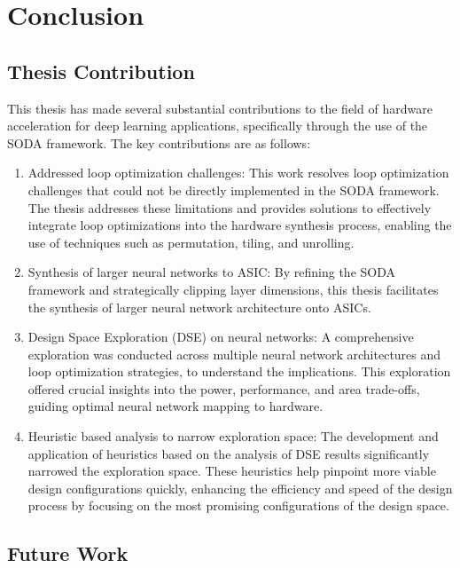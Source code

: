 \fancyhf{}
\fancyfoot[CO, CE]{ \thepage}

\chapter{Conclusion}
\label{chapter5}

\section{Thesis Contribution}

This thesis has made several substantial contributions to the field of hardware acceleration for deep learning applications, specifically through the use of the SODA framework. The key contributions are as follows:

\begin{enumerate}
    \item Addressed loop optimization challenges: This work resolves loop optimization challenges that could not be directly implemented in the SODA framework. The thesis addresses these limitations and provides solutions to effectively integrate loop optimizations into the hardware synthesis process, enabling the use of techniques such as permutation, tiling, and unrolling. 
    \item Synthesis of larger neural networks to ASIC: By refining the SODA framework and strategically clipping layer dimensions, this thesis facilitates the synthesis of larger neural network architecture onto ASICs.
    \item Design Space Exploration (DSE) on neural networks: A comprehensive exploration was conducted across multiple neural network architectures  and loop optimization strategies, to understand the implications. This exploration offered crucial insights into the power, performance, and area trade-offs, guiding optimal neural network mapping to hardware.
    \item Heuristic based analysis to narrow exploration space: The development and application of heuristics based on the analysis of DSE results significantly narrowed the exploration space. These heuristics help pinpoint more viable design configurations quickly, enhancing the efficiency and speed of the design process by focusing on the most promising configurations of the design space.
\end{enumerate}

\section{Future Work}


